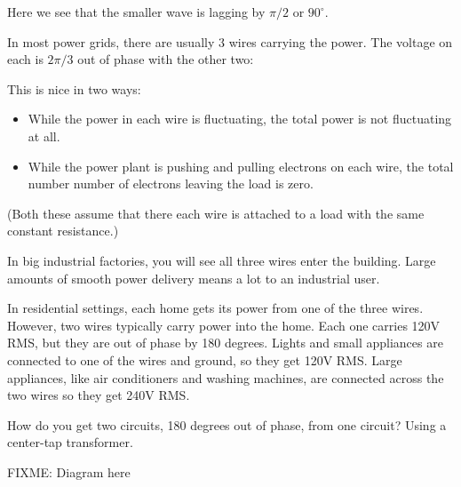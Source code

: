 Here we see that the smaller wave is lagging by $\pi/2$ or $90^\circ$.

In most power grids, there are usually 3 wires carrying the power.
The voltage on each is $2\pi/3$ out of phase with the other two:


This is nice in two ways:
\begin{itemize}
\item While the power in each wire is fluctuating, the total power is not fluctuating at all.
\item While the power plant is pushing and pulling electrons on each
  wire, the total number number of electrons leaving the load is zero.
\end{itemize}
(Both these assume that there each wire is attached to a load with the same constant resistance.)

In big industrial factories, you will see all three wires enter the
building. Large amounts of smooth power delivery means a lot to an
industrial user.

In residential settings, each home gets its power from one of the three
wires. However, two wires typically carry power into the home. Each
one carries 120V RMS, but they are out of phase by 180 degrees. Lights
and small appliances are connected to one of the wires and ground, so
they get 120V RMS.  Large appliances, like air conditioners and
washing machines, are connected across the two wires so they get 240V
RMS.



How do you get two circuits, 180 degrees out of phase, from one
circuit?  Using a center-tap transformer.

FIXME: Diagram here




